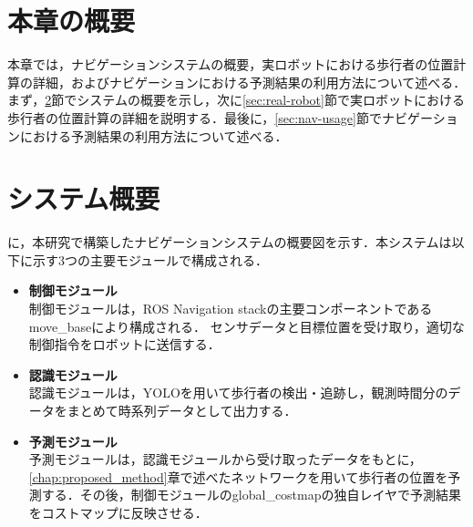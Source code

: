 

\section{本章の概要}

本章では，ナビゲーションシステムの概要，実ロボットにおける歩行者の位置計算の詳細，およびナビゲーションにおける予測結果の利用方法について述べる．まず，\ref{sec:nav-sys}節でシステムの概要を示し，次に\ref{sec:real-robot}節で実ロボットにおける歩行者の位置計算の詳細を説明する．最後に，\ref{sec:nav-usage}節でナビゲーションにおける予測結果の利用方法について述べる．


\section{システム概要}\label{sec:nav-sys}
に，本研究で構築したナビゲーションシステムの概要図を示す．本システムは以下に示す3つの主要モジュールで構成される．

\begin{itemize}
  \item \textbf{制御モジュール} \\
  制御モジュールは，ROS Navigation stackの主要コンポーネントであるmove\_baseにより構成される．
  センサデータと目標位置を受け取り，適切な制御指令をロボットに送信する．
  \item \textbf{認識モジュール} \\
  認識モジュールは，YOLOを用いて歩行者の検出・追跡し，観測時間分のデータをまとめて時系列データとして出力する．
  \item \textbf{予測モジュール} \\
  予測モジュールは，認識モジュールから受け取ったデータをもとに，\ref{chap:proposed_method}章で述べたネットワークを用いて歩行者の位置を予測する．その後，制御モジュールのglobal\_costmapの独自レイヤで予測結果をコストマップに反映させる．
\end{itemize}



\vspace{-10pt}

